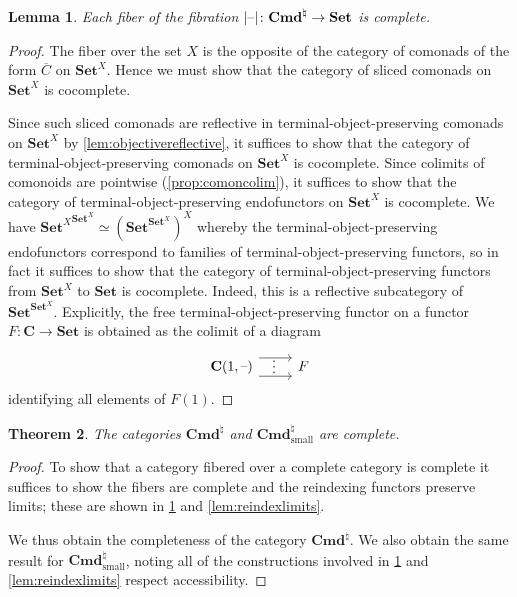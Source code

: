 \documentclass[11pt, oneside, article]{memoir}
\theoremstyle{plain}
\newtheorem{theorem}{Theorem}[section]
\newtheorem{lemma}[theorem]{Lemma}
\theoremstyle{definition}
\theoremstyle{remark}
\DeclarePairedDelimiter{\abs}{\lvert}{\rvert}
\newcommand{\dash}{{\mathord{\text{--}}}}
\newcommand{\namedcat}[1]{\mathbf{#1}}
\newcommand{\cat}[1]{\mathbf{#1}}
\newcommand{\Set}{\namedcat{Set}}
\newcommand{\Con}{\namedcat{Cmd}^\natural}
\newcommand{\ConSet}{\Con}
\newcommand{\ConO}{\Con}
\newcommand{\ConOSet}{\ConO}
\newcommand{\clift}[1]{\overline{#1}}
\newcommand{\pts}[1]{{\abs{#1}}}
\newcommand{\one}[1]{\pts{#1}}
\newcommand{\fun}[2]{{#2}^{#1}}
\newcommand{\Ho}[1]{#1}
\newcommand{\AccCon}{\Con_{\mathrm{small}}}
\newcommand{\AccConSet}{\AccCon}
\newcommand{\cmnd}[1]{{#1}}
\newcommand{\xX}{X}
\newcommand{\cC}{\cmnd{C}}
\newcommand{\bC}{\cat{C}}
\begin{document}
\begin{lemma}\label{lem:fiberlimits}
  Each fiber of the fibration $\one{\dash} \colon \ConOSet \to \Set$
  is complete.
\end{lemma}
\begin{proof}
  The fiber over the set $\xX$ is the opposite of the category of
  comonads of the form $\clift{\cC}$ on $\Set^\xX$. Hence we must show
  that the category of sliced comonads on $\Set^\xX$ is cocomplete.

  Since such sliced comonads are reflective in
  terminal-object-preserving comonads on $\Set^\xX$ by
  \cref{lem:objectivereflective}, it suffices to show that the
  category of terminal-object-preserving comonads on $\Set^\xX$ is
  cocomplete. Since colimits of comonoids are pointwise
  (\cref{prop:comoncolim}), it suffices to show that the category of
  terminal-object-preserving endofunctors on $\Set^\xX$ is
  cocomplete. We have
  $\fun{\Set^\xX}{\Set^\xX} \simeq \fun{\xX}{(\fun{\Set^\xX}{\Set})}$
  whereby the terminal-object-preserving endofunctors correspond to
  families of terminal-object-preserving functors, so in fact it
  suffices to show that the category of terminal-object-preserving
  functors from $\Set^\xX$ to $\Set$ is cocomplete. Indeed, this is a
  reflective subcategory of $\fun{\Set^\xX}{\Set}$. Explicitly, the
  free terminal-object-preserving functor on a functor
  $F \colon \bC \to \Set$ is obtained as the colimit of a diagram
  \[\begin{tikzcd}
      {\Ho{\bC}(1, \dash)} & F
      \arrow["\vdots" {xshift=-1pt}, shift right=2.75, from=1-1, to=1-2]
      \arrow[shift left=2.75, from=1-1, to=1-2]
    \end{tikzcd}\] identifying all elements of
  $F(1)$.
\end{proof}

\begin{theorem}\label{thm:contcomplete}
  The categories $\ConSet$ and $\AccConSet$ are complete.
\end{theorem}
\begin{proof}
  To show that a category fibered over a complete category is complete
  it suffices to show the fibers are complete and the reindexing
  functors preserve limits; these are shown in \cref{lem:fiberlimits}
  and \cref{lem:reindexlimits}.

  We thus obtain the completeness of the category $\ConOSet$. We also
  obtain the same result for $\AccConSet$, noting all of the
  constructions involved in \cref{lem:fiberlimits} and
  \cref{lem:reindexlimits} respect accessibility.
\end{proof}
\end{document}
